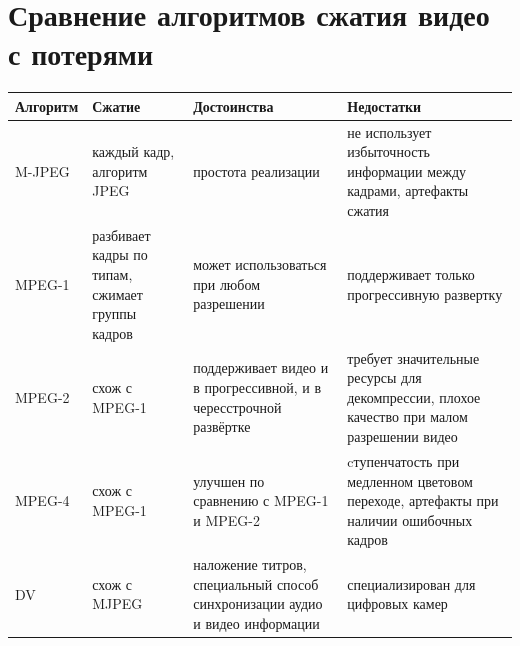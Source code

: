 \documentclass[12pt]{article}
\begin{document}
\section{Сравнение алгоритмов сжатия видео с потерями}

\begin{table}[ht]\footnotesize 
  \begin{tabular}{|p{3.5cm}|p{7cm}|p{7cm}|p{7cm}|}
  \hline
  Алгоритм      & Сжатие & Достоинства & Недостатки \\
  \hline
  M-JPEG  & каждый кадр, алгоритм JPEG & простота реализации & не использует избыточность информации между кадрами, артефакты сжатия \\
  \hline
  MPEG-1       & разбивает кадры по типам, сжимает группы кадров & может использоваться при любом разрешении & поддерживает только прогрессивную развертку \\
  \hline
  MPEG-2   & схож с MPEG-1 & поддерживает видео и в прогрессивной, и в чересстрочной развёртке & требует значительные ресурсы для декомпрессии, плохое качество при малом разрешении видео \\
  \hline
  MPEG-4  & схож с MPEG-1 & улучшен по сравнению с MPEG-1 и MPEG-2 & cтупенчатость при медленном цветовом переходе, артефакты при наличии ошибочных кадров\\
  \hline
  DV  & схож с MJPEG & наложение титров, специальный способ синхронизации аудио и видео информации & специализирован для цифровых камер \\
  \hline
  \end{tabular}
  \label{tab:tabular}
\end{table}

% 
% 
% 
% 

\end{document}
